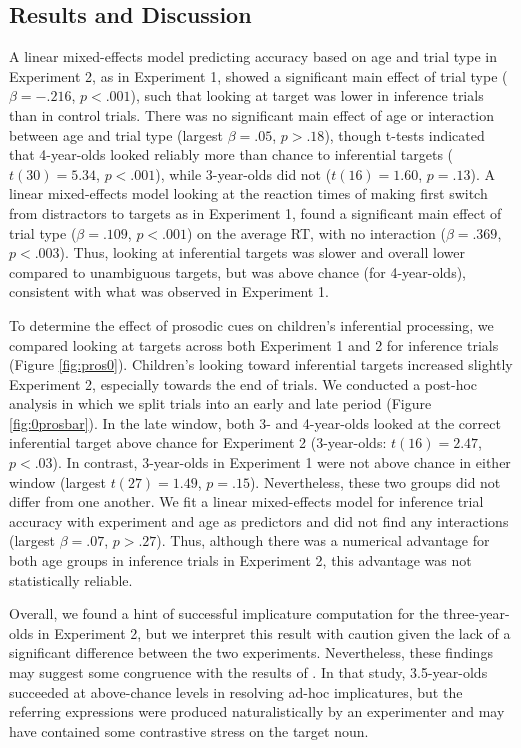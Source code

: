 \documentclass[10pt,letterpaper]{article}
\begin{document}
\subsection{Results and Discussion}

A linear mixed-effects model predicting accuracy based on age and trial type in Experiment 2, as in Experiment 1, showed a significant main effect of trial type ($\beta = -.216$, $p <.001$), such that looking at target was lower in inference trials than in control trials. There was no significant main effect of age or interaction between age and trial type (largest $\beta = .05$, $p >.18$), though t-tests indicated that 4-year-olds looked reliably more than chance to inferential targets ($t(30) = 5.34$, $p <.001$), while 3-year-olds did not ($t(16) = 1.60$, $p =.13$). A linear mixed-effects model looking at the reaction times of making first switch from distractors to targets as in Experiment 1, found a significant main effect of trial type ($\beta = .109$, $p <.001$) on the average RT, with no interaction ($\beta = .369$, $p <.003$). Thus, looking at inferential targets was slower and overall lower compared to unambiguous targets, but was above chance (for 4-year-olds), consistent with what was observed in Experiment 1.

To determine the effect of prosodic cues on children's inferential processing, we compared looking at targets across both Experiment 1 and 2 for inference trials (Figure \ref{fig:pros0}). Children's looking toward inferential targets increased slightly Experiment 2, especially towards the end of trials. We conducted a post-hoc analysis in which we split trials into an early and late period (Figure \ref{fig:0prosbar}). In the late window, both 3- and 4-year-olds looked at the correct inferential target above chance for Experiment 2 (3-year-olds: $t(16) = 2.47$, $p < .03$). In contrast, 3-year-olds in Experiment 1 were not above chance in either window (largest $t(27) = 1.49$, $p = .15$). Nevertheless, these two groups did not differ from one another. We fit a linear mixed-effects model for inference trial accuracy with experiment and age as predictors and did not find any interactions (largest $\beta = .07$, $p > .27$). Thus, although there was a numerical advantage for both age groups in inference trials in Experiment 2, this advantage was not statistically reliable. 

Overall, we found a hint of successful implicature computation for the three-year-olds in Experiment 2, but we interpret this result with caution given the lack of a significant difference between the two experiments. Nevertheless, these findings may suggest some congruence with the results of . In that study, 3.5-year-olds succeeded at above-chance levels in resolving ad-hoc implicatures, but the referring expressions were produced naturalistically by an experimenter and may have contained some contrastive stress on the target noun. 
\end{document}
